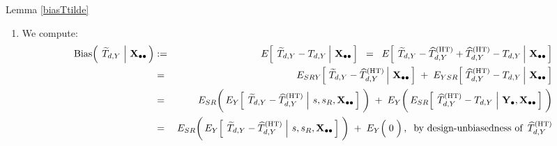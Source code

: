 \proofof Lemma \ref{biasTtilde}
\vskip 0.1cm
\renewcommand{\theenumi}{\roman{enumi}}
\renewcommand{\labelenumi}{\mbox{}\;\;\,(\theenumi)$\quad$}
\begin{enumerate}
\item
    We compute:
    \begin{eqnarray*}
    \bias\!\left(\;
        \left.
        \widetilde{T}_{d,Y}
        \;\right\vert\,
        \Xobs
        \,\right)
    & := &
        E\!\left[\;
            \left.
            \widetilde{T}_{d,Y} - T_{d,Y}
            \,\right\vert\,
            \Xobs
            \,\right]
    \;\; = \;\;
        E\!\left[\;
            \left.
            \widetilde{T}_{d,Y} - \widehat{T}^{\textnormal{(HT)}}_{d,Y} + \widehat{T}^{\textnormal{(HT)}}_{d,Y} - T_{d,Y}
            \,\right\vert\,
            \Xobs
            \,\right]
    \\
    & = &
        E_{SRY}\!\left[\,
            \left.
            \widetilde{T}_{d,Y} - \widehat{T}^{\textnormal{(HT)}}_{d,Y}
            \,\right\vert\,
            \Xobs
            \,\right]
        \; + \;
        E_{YSR}\!\left[\,
            \left.
            \widehat{T}^{\textnormal{(HT)}}_{d,Y} - T_{d,Y}
            \,\right\vert\,
            \Xobs
            \,\right]
    \\
    & = &
        E_{SR}\!\left(\,
            \overset{{\color{white}.}}{E_{Y}\!\left[\;
                \left.
                \widetilde{T}_{d,Y} \overset{{\color{white}.}}{-} \widehat{T}^{\textnormal{(HT)}}_{d,Y}
                \;\right\vert\,
                s,s_{R},\Xobs
                \,\right]}
            \;\right)
        \; + \;
        E_{Y}\!\left(\,
            \overset{{\color{white}.}}{E_{SR}\!\left[\;
                \left.
                \widehat{T}^{\textnormal{(HT)}}_{d,Y} \overset{{\color{white}.}}{-} T_{d,Y}
                \;\right\vert\,
                \Ydot,\Xobs
                \,\right]}
            \;\right)
    \\
    & = &
        E_{SR}\!\left(\,
            \overset{{\color{white}.}}{E_{Y}\!\left[\;
                \left.
                \widetilde{T}_{d,Y} \overset{{\color{white}.}}{-} \widehat{T}^{\textnormal{(HT)}}_{d,Y}
                \;\right\vert\,
                s,s_{R},\Xobs
                \,\right]}
            \;\right)
        \; + \;
        E_{Y}\!\left(\;\overset{{\color{white}.}}{0}\;\right),
        \;\;
        \textnormal{by design-unbiasedness of \,$\widehat{T}^{\textnormal{(HT)}}_{d,Y}$}
    \\

\end{eqnarray*}
\end{enumerate}
